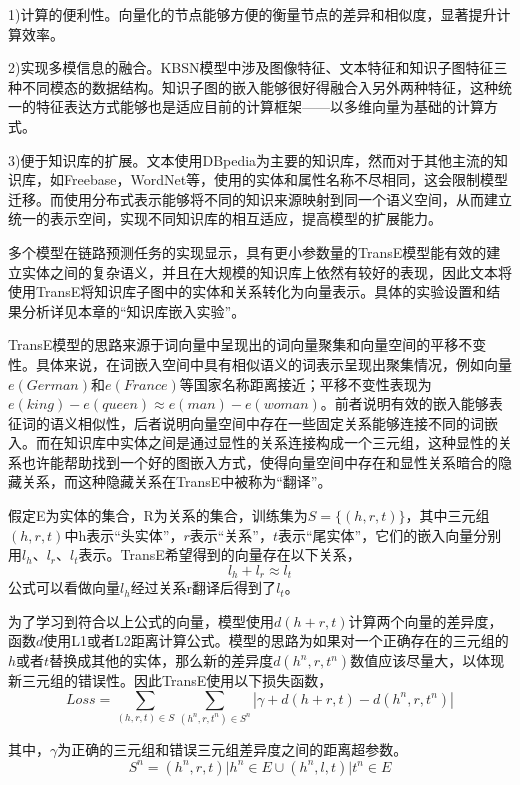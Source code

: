 1)计算的便利性。向量化的节点能够方便的衡量节点的差异和相似度，显著提升计算效率。 

2)实现多模信息的融合。KBSN模型中涉及图像特征、文本特征和知识子图特征三种不同模态的数据结构。知识子图的嵌入能够很好得融合入另外两种特征，这种统一的特征表达方式能够也是适应目前的计算框架——以多维向量为基础的计算方式。

3)便于知识库的扩展。文本使用DBpedia为主要的知识库，然而对于其他主流的知识库，如Freebase，WordNet等，使用的实体和属性名称不尽相同，这会限制模型迁移。而使用分布式表示能够将不同的知识来源映射到同一个语义空间，从而建立统一的表示空间，实现不同知识库的相互适应，提高模型的扩展能力。

多个模型在链路预测任务的实现显示，具有更小参数量的TransE模型能有效的建立实体之间的复杂语义，并且在大规模的知识库上依然有较好的表现，因此文本将使用TransE将知识库子图中的实体和关系转化为向量表示。具体的实验设置和结果分析详见本章的“知识库嵌入实验”。

TransE模型的思路来源于词向量中呈现出的词向量聚集和向量空间的平移不变性。具体来说，在词嵌入空间中具有相似语义的词表示呈现出聚集情况，例如向量$e(German)$和$e(France)$等国家名称距离接近；平移不变性表现为$e(king)-e(queen)\approx e(man)-e(woman)$。前者说明有效的嵌入能够表征词的语义相似性，后者说明向量空间中存在一些固定关系能够连接不同的词嵌入。而在知识库中实体之间是通过显性的关系连接构成一个三元组，这种显性的关系也许能帮助找到一个好的图嵌入方式，使得向量空间中存在和显性关系暗合的隐藏关系，而这种隐藏关系在TransE中被称为“翻译”。

假定E为实体的集合，R为关系的集合，训练集为$S=\{(h,r,t)\}$，其中三元组$(h,r,t)$中h表示“头实体”，$r$表示“关系”，$t$表示“尾实体”，它们的嵌入向量分别用$l_h$、$l_r$、$l_t$表示。TransE希望得到的向量存在以下关系，
\begin{equation}
l_h+l_r \approx l_t
\end{equation}
公式可以看做向量$l_h$经过关系r翻译后得到了$l_t$。

为了学习到符合以上公式的向量，模型使用$d(h+r, t)$计算两个向量的差异度，函数$d$使用L1或者L2距离计算公式。模型的思路为如果对一个正确存在的三元组的$h$或者$t$替换成其他的实体，那么新的差异度$d(h^n,r,t^n)$数值应该尽量大，以体现新三元组的错误性。因此TransE使用以下损失函数，
\begin{equation}
Loss = \sum_{(h,r,t) \in S}\sum_{(h^n,r,t^n)\in S^n}|\gamma+d(h+r, t)-d(h^n,r,t^n)|
\end{equation}

其中，$\gamma$为正确的三元组和错误三元组差异度之间的距离超参数。
\begin{equation}
S^n = {(h^n,r,t)|h^n \in E} \cup {(h^n,l,t)|t^n \in E}
\end{equation}

